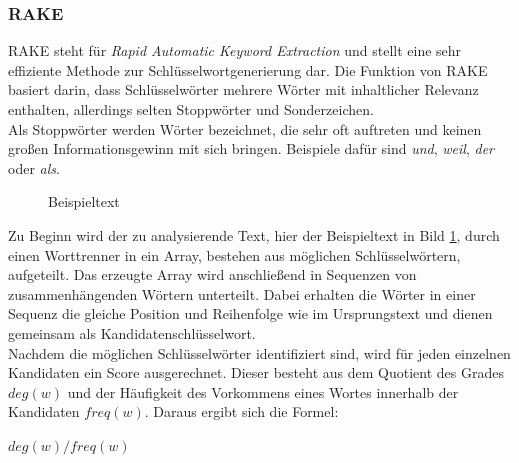 		\subsubsection{RAKE}
			\label{sec:RAKE}
			RAKE steht für \textit{Rapid Automatic Keyword Extraction} und stellt eine sehr effiziente Methode zur Schlüsselwortgenerierung dar. Die Funktion von RAKE basiert darin, dass Schlüsselwörter mehrere Wörter mit inhaltlicher Relevanz enthalten, allerdings selten Stoppwörter und Sonderzeichen.\cite{rose2010automatic}\\
			Als Stoppwörter werden Wörter bezeichnet, die sehr oft auftreten und keinen großen Informationsgewinn mit sich bringen. Beispiele dafür sind \textit{und}, \textit{weil}, \textit{der} oder \textit{als}.\cite{Stopwords}\\
			
			\begin{figure}[h!]
				\caption{Beispieltext \cite{schubert2011didaktik}}
				\label{fig:text}
			\end{figure}
			
			Zu Beginn wird der zu analysierende Text, hier der Beispieltext in  Bild \ref{fig:text}, durch einen Worttrenner in ein Array, bestehen aus möglichen Schlüsselwörtern, aufgeteilt. Das erzeugte Array wird anschließend in Sequenzen von zusammenhängenden Wörtern unterteilt. Dabei erhalten die Wörter in einer Sequenz die gleiche Position und Reihenfolge wie im Ursprungstext und dienen gemeinsam als Kandidatenschlüsselwort.\cite{rose2010automatic}\\		
			Nachdem die möglichen Schlüsselwörter identifiziert sind, wird für jeden einzelnen Kandidaten ein Score ausgerechnet. Dieser besteht aus dem Quotient des Grades $deg(w)$ und der Häufigkeit des Vorkommens eines Wortes innerhalb der Kandidaten $freq(w)$. Daraus ergibt sich die Formel:
			\begin{center}
				$deg(w)/freq(w) $
			\end{center}	
			
